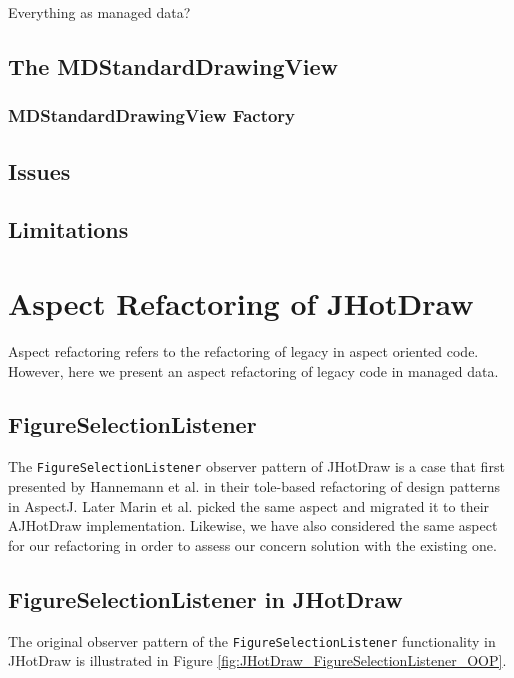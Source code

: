 Everything as managed data?

\subsection{The MDStandardDrawingView}

\subsubsection{MDStandardDrawingView Factory}

\subsection{Issues}

\subsection{Limitations}

\section{Aspect Refactoring of JHotDraw}
Aspect refactoring refers to the refactoring of legacy in aspect oriented code. 
However, here we present an aspect refactoring of legacy code in managed data.

\subsection{FigureSelectionListener}
The \texttt{FigureSelectionListener} observer pattern of JHotDraw is a case that first presented by Hannemann et al. \cite{hannemann2005role} in their tole-based refactoring of design patterns in AspectJ. 
Later Marin et al. picked the same aspect and migrated it to their AJHotDraw implementation.
Likewise, we have also considered the same aspect for our refactoring in order to assess our concern solution with the existing one.

\subsection{FigureSelectionListener in JHotDraw}
The original observer pattern of the \texttt{FigureSelectionListener} functionality in JHotDraw is illustrated in Figure \ref{fig:JHotDraw_FigureSelectionListener_OOP}.

